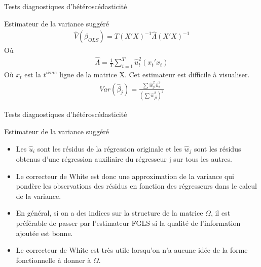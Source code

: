\documentclass{beamer}
\begin{document}
\begin{frame}{Tests diagnostiques d'hétéroscédasticité}
\begin{block}{Estimateur de la variance suggéré}
\begin{align*}
\hat{V}(\hat{\beta}_{OLS})=T(X'X)^{-1} \hat{\Lambda} (X'X)^{-1}
\end{align*}
Où
\begin{align*}
\hat{\Lambda}=\frac{1}{T} \sum_{t=1}^T \hat{u}_t^2 (x_t'x_t)
\end{align*}
Où $x_t$ est la $t^{ième}$ ligne de la matrice X. Cet estimateur est difficile à visualiser. 
\begin{align*}
Var(\hat{\beta}_j)=\frac{\sum \hat{w}_{ji}^2\hat{u}_i^2}{(\sum \hat{w}_{ji}^2)^2}
\end{align*}
\end{block}
\end{frame}

\begin{frame}{Tests diagnostiques d'hétéroscédasticité}
\begin{block}{Estimateur de la variance suggéré}
\begin{itemize}
\item Les $\hat{u}_i$ sont les résidus de la régression originale et les $\hat{w}_j$ sont les résidus obtenus d'une régression auxiliaire du régresseur j sur tous les autres.
\item Le correcteur de White est donc une approximation de la variance qui pondère les observations des résidus en fonction des régresseurs dans le calcul de la variance. 
\item En général, si on a des indices sur la structure de la matrice $\Omega$, il est préférable de passer par l’estimateur FGLS si la qualité de l’information ajoutée est bonne. 
\item Le correcteur de White est très utile lorsqu’on n’a aucune idée de la forme fonctionnelle à donner à $\Omega$. 
\end{itemize}
\end{block}
\end{frame}
\end{document}
